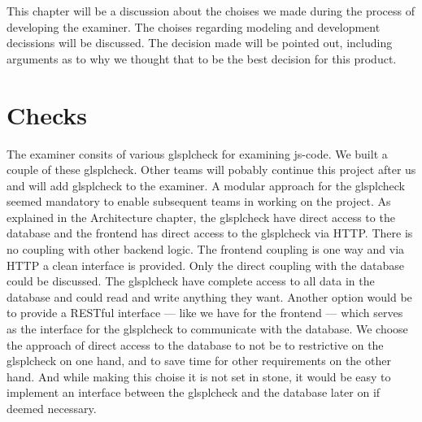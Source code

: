%

This chapter will be a discussion about the choises we made
during the process of developing the \gls{examiner}.
The choises regarding modeling and development decissions will be discussed.
The decision made will be pointed out,
including arguments as to why we thought
that to be the best decision for this product.

\section{Checks}
The \gls{examiner} consits of various glspl{check} for examining \gls{js-code}.
We built a couple of these glspl{check}.
Other teams will pobably continue this project after us
and will add glspl{check} to the \gls{examiner}.
A modular approach for the glspl{check} seemed mandatory to enable
subsequent teams in working on the project.
As explained in the Architecture chapter,
the glspl{check} have direct access to the database
and the frontend has direct access to the glspl{check} via HTTP.
There is no coupling with other backend logic.
The frontend coupling is one way
and via HTTP a clean interface is provided.
Only the direct coupling with the database could be discussed.
The glspl{check} have complete access to all data in the database
and could read and write anything they want.
Another option would be to provide a RESTful interface ---
like we have for the frontend ---
which serves as the interface for the glspl{check} to communicate with the database.
We choose the approach of direct access to the database
to not be to restrictive on the glspl{check} on one hand,
and to save time for other requirements on the other hand.
And while making this choise it is not set in stone,
it would be easy to implement an interface
between the glspl{check} and the database later on if deemed necessary.

